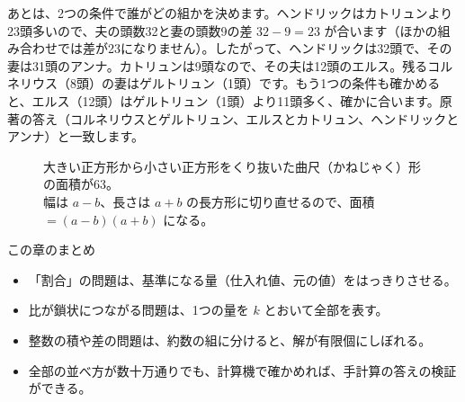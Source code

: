 \documentclass[a4paper,11pt,openany]{ltjsbook}
\begin{document}
あとは、2つの条件で誰がどの組かを決めます。ヘンドリックはカトリュンより23頭多いので、夫の頭数32と妻の頭数9の差 $32-9=23$ が合います（ほかの組み合わせでは差が23になりません）。したがって、ヘンドリックは32頭で、その妻は31頭のアンナ。カトリュンは9頭なので、その夫は12頭のエルス。残るコルネリウス（8頭）の妻はゲルトリュン（1頭）です。もう1つの条件も確かめると、エルス（12頭）はゲルトリュン（1頭）より11頭多く、確かに合います。原著の答え（コルネリウスとゲルトリュン、エルスとカトリュン、ヘンドリックとアンナ）と一致します。

\begin{figure}[htbp]
\centering
{}
\caption{大きい正方形から小さい正方形をくり抜いた曲尺（かねじゃく）形の面積が63。\\幅は $a-b$、長さは $a+b$ の長方形に切り直せるので、面積 $=(a-b)(a+b)$ になる。}
\end{figure}

\begin{pointbox}{この章のまとめ}
\begin{itemize}[leftmargin=*]
\item 「割合」の問題は、基準になる量（仕入れ値、元の値）をはっきりさせる。
\item 比が鎖状につながる問題は、1つの量を $k$ とおいて全部を表す。
\item 整数の積や差の問題は、約数の組に分けると、解が有限個にしぼれる。
\item 全部の並べ方が数十万通りでも、計算機で確かめれば、手計算の答えの検証ができる。
\end{itemize}
\end{pointbox}

\end{document}
